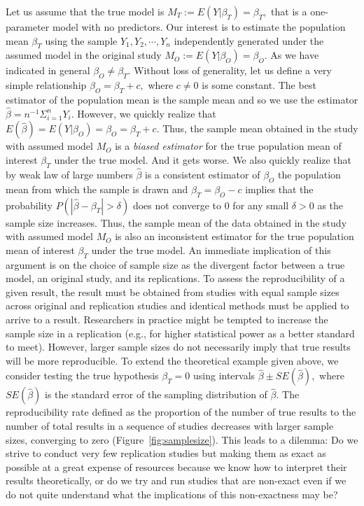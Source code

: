 \documentclass[meta,authordate]{jote-new-article}
\newcounter{result}
\begin{document}
Let us assume that the true model is $M_T:=E(Y|\beta_{T})=\beta_{T},$ that is a one-parameter model with no predictors. Our interest is to estimate the population mean $\beta_{T}$ using the sample $Y_1,Y_2,\cdots, Y_n$ independently generated under the assumed model in the original study $M_O:=E(Y|\beta_{O})=\beta_{O}.$ As we have indicated in general $\beta_{O} \neq \beta_{T}.$ Without loss of generality, let us define a very simple relationship $\beta_{O}=\beta_{T}+c,$ where $c\neq 0$ is some constant. The best estimator of the population mean is the sample mean and so we use the estimator $\hat{\beta}=n^{-1}\Sigma_{i=1}^{n}Y_i.$ However, we quickly realize that $E(\hat{\beta})=E(Y|\beta_{O})=\beta_{O}=\beta_{T}+c.$ Thus, the sample mean obtained in the study with assumed model $M_O$ is a {\em biased estimator} for the true population mean of interest $\beta_{T}$ under the true model. And it gets worse. We also quickly realize that by weak law of large numbers $\hat{\beta}$ is a consistent estimator of $\beta_{O}$ the population mean from which the sample is drawn and  $\beta_{T}=\beta_{O}-c$ implies that the probability $P(|\hat{\beta}-\beta_{T}|>\delta)$ does not converge to $0$ for any small $\delta>0$ as the sample size increases. Thus, the sample mean of the data obtained in the study with assumed model $M_O$ is also an inconsistent estimator for the true population mean of interest $\beta_{T}$ under the true model.
%
An immediate implication of this argument is on the choice of sample size as the divergent factor between a true model, an original study, and its replications. To assess the reproducibility of a given result, the result must be obtained from studies with equal sample sizes across original and replication studies and identical methods must be applied to arrive to a result. Researchers in practice might be tempted to increase the sample size in a replication (e.g., for higher statistical power as a better standard to meet). However, larger sample sizes do not necessarily imply that true results will be more reproducible. To extend the theoretical example given above, we consider testing the true hypothesis $\beta_{T} = 0$ using intervals $\hat{\beta} \pm SE(\hat{\beta}),$ where ${SE}(\hat{\beta})$ is the standard error of the sampling distribution of $\hat{\beta}$. The reproducibility rate defined as the proportion of the number of true results to the number of total results in a sequence of studies decreases with larger sample sizes, converging to zero (Figure~\ref{fig:samplesize}). This leads to a dilemma: Do we strive to conduct very few replication studies but making them as exact as possible at a great expense of resources because we know how to interpret their results theoretically, or do we try and run studies that are non-exact even if we do not quite understand what the implications of this non-exactness may be?
\end{document}
